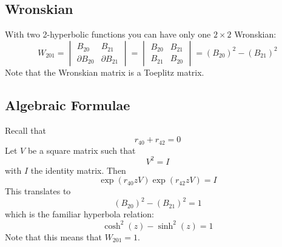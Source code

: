 \subsection{Wronskian}
With two 2-hyperbolic functions you can have only one $2 \times 2$ Wronskian:
\begin{equation}
    W_{201} = \begin{vmatrix}
        B_{20} & B_{21} \\ \partial B_{20} & \partial B_{21}
    \end{vmatrix} = \begin{vmatrix}
        B_{20} & B_{21} \\ B_{21} & B_{20}
    \end{vmatrix} = \left( B_{20} \right)^{2} - \left( B_{21} \right)^{2}
\end{equation}
Note that the Wronskian matrix is a Toeplitz matrix.
\subsection{Algebraic Formulae}
Recall that
\begin{equation}
    r_{40} + r_{42} = 0
\end{equation}
Let $V$ be a square matrix such that
\begin{equation}
    V^{2} = I
\end{equation}
with $I$ the identity matrix. Then
\begin{equation}
    \exp\left(r_{40} z V\right) \exp\left(r_{42} z V\right) = I
\end{equation}
This translates to
\begin{equation}
    \left( B_{20} \right)^{2} - \left( B_{21} \right)^{2} = 1
\end{equation}
which is the familiar hyperbola relation:
\begin{equation}
    \cosh^{2}(z) - \sinh^{2}(z) = 1
\end{equation}
Note that this means that $W_{201} = 1$.
